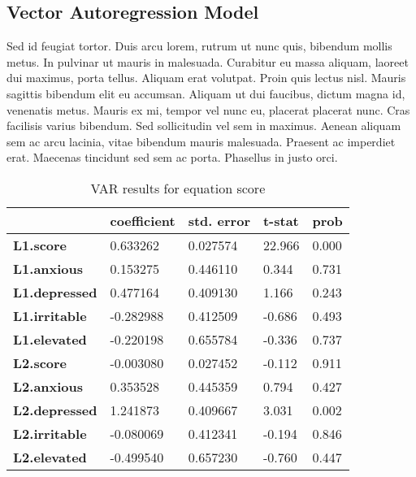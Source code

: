 \documentclass{article}
\begin{document}
\hypertarget{vector-autoregression-model}{%
\subsection{Vector Autoregression
Model}\label{vector-autoregression-model}}

Sed id feugiat tortor. Duis arcu lorem, rutrum ut nunc quis, bibendum
mollis metus. In pulvinar ut mauris in malesuada. Curabitur eu massa
aliquam, laoreet dui maximus, porta tellus. Aliquam erat volutpat. Proin
quis lectus nisl. Mauris sagittis bibendum elit eu accumsan. Aliquam ut
dui faucibus, dictum magna id, venenatis metus. Mauris ex mi, tempor vel
nunc eu, placerat placerat nunc. Cras facilisis varius bibendum. Sed
sollicitudin vel sem in maximus. Aenean aliquam sem ac arcu lacinia,
vitae bibendum mauris malesuada. Praesent ac imperdiet erat. Maecenas
tincidunt sed sem ac porta. Phasellus in justo orci.

\begin{table}[hb]
    \centering
    \begin{tabular}{lllll}
      \toprule
       ~ & \textbf{coefficient} & \textbf{std. error} & \textbf{t-stat} & \textbf{prob} \\ \midrule
        \textbf{L1.score} & 0.633262 & 0.027574 & 22.966 & 0.000 \\
        \textbf{L1.anxious} & 0.153275 & 0.446110 & 0.344 & 0.731 \\
        \textbf{L1.depressed} & 0.477164 & 0.409130 & 1.166 & 0.243 \\
        \textbf{L1.irritable} & -0.282988 & 0.412509 & -0.686 & 0.493 \\
        \textbf{L1.elevated} & -0.220198 & 0.655784 & -0.336 & 0.737 \\
        \textbf{L2.score} & -0.003080 & 0.027452 & -0.112 & 0.911 \\
        \textbf{L2.anxious} & 0.353528 & 0.445359 & 0.794 & 0.427 \\
        \textbf{L2.depressed} & 1.241873 & 0.409667 & 3.031 & 0.002 \\
        \textbf{L2.irritable} & -0.080069 & 0.412341 & -0.194 & 0.846 \\
        \textbf{L2.elevated} & -0.499540 & 0.657230 & -0.760 & 0.447 \\
        \bottomrule
    \end{tabular}
    \caption{VAR results for equation score}
    \label{VARScoreResults}
\end{table}
\end{document}
